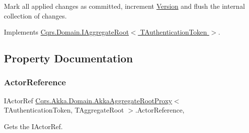 Mark all applied changes as committed, increment \hyperlink{classCqrs_1_1Akka_1_1Domain_1_1AkkaAggregateRootProxy_a24ff2ddef0d416ac5b936c1887ac2154_a24ff2ddef0d416ac5b936c1887ac2154}{Version} and flush the internal collection of changes. 



Implements \hyperlink{interfaceCqrs_1_1Domain_1_1IAggregateRoot_af31116870bbf6566b3eec0b8bc02c6de_af31116870bbf6566b3eec0b8bc02c6de}{Cqrs.\+Domain.\+I\+Aggregate\+Root$<$ T\+Authentication\+Token $>$}.



\subsection{Property Documentation}
\mbox{\label{classCqrs_1_1Akka_1_1Domain_1_1AkkaAggregateRootProxy_ad85e7a51c716484df8e5e8ea9ff31351_ad85e7a51c716484df8e5e8ea9ff31351}} 
\subsubsection{\texorpdfstring{Actor\+Reference}{ActorReference}}
{\footnotesize\ttfamily I\+Actor\+Ref \hyperlink{classCqrs_1_1Akka_1_1Domain_1_1AkkaAggregateRootProxy}{Cqrs.\+Akka.\+Domain.\+Akka\+Aggregate\+Root\+Proxy}$<$ T\+Authentication\+Token, T\+Aggregate\+Root $>$.Actor\+Reference\hspace{0.3cm}{\ttfamily [get]}, {\ttfamily [set]}}



Gets the I\+Actor\+Ref. 

\mbox{\label{classCqrs_1_1Akka_1_1Domain_1_1AkkaAggregateRootProxy_a45e41e24822f4a9a8077e10c153de163_a45e41e24822f4a9a8077e10c153de163}} 
